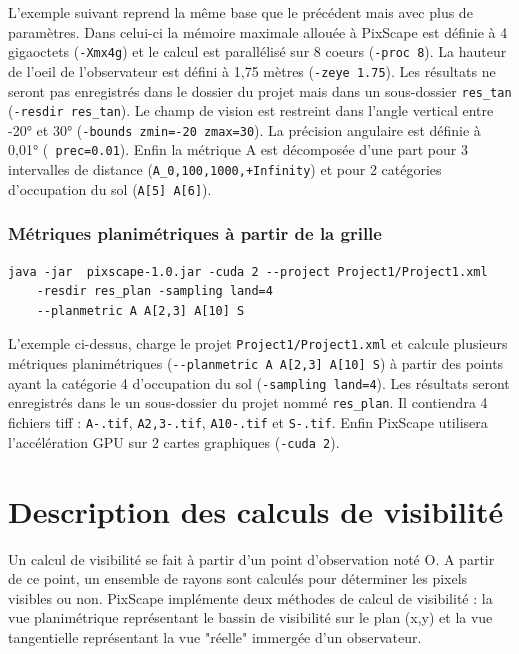 \documentclass{report}
\begin{document}
L'exemple suivant reprend la même base que le précédent mais avec plus de paramètres. Dans celui-ci la mémoire maximale allouée à PixScape est définie à 4 gigaoctets (\verb|-Xmx4g|) et le calcul est parallélisé sur 8 coeurs (\verb|-proc 8|). La hauteur de l'oeil de l'observateur est défini à 1,75 mètres (\verb|-zeye 1.75|). Les résultats ne seront pas enregistrés dans le dossier du projet mais dans un sous-dossier \verb|res_tan| (\verb|-resdir res_tan|). Le champ de vision est restreint dans l'angle vertical entre -20° et 30° (\verb|-bounds zmin=-20 zmax=30|). La précision angulaire est définie à 0,01° (\verb| prec=0.01|). Enfin la métrique A est décomposée d'une part pour 3 intervalles de distance (\verb|A_0,100,1000,+Infinity|) et pour 2 catégories d'occupation du sol (\verb|A[5] A[6]|).

\subsection{Métriques planimétriques à partir de la grille}
\begin{Verbatim}
java -jar  pixscape-1.0.jar -cuda 2 --project Project1/Project1.xml
	-resdir res_plan -sampling land=4 
	--planmetric A A[2,3] A[10] S
\end{Verbatim}
L'exemple ci-dessus, charge le projet \verb|Project1/Project1.xml| et calcule plusieurs métriques planimétriques (\verb|--planmetric A A[2,3] A[10] S|) à partir des points ayant la catégorie 4 d'occupation du sol (\verb|-sampling land=4|). Les résultats seront enregistrés dans le un sous-dossier du projet nommé \verb|res_plan|. Il contiendra 4 fichiers tiff : \verb|A-.tif|, \verb|A2,3-.tif|, \verb|A10-.tif| et \verb|S-.tif|. Enfin PixScape utilisera l'accélération GPU sur 2 cartes graphiques (\verb|-cuda 2|).


\chapter{Description des calculs de visibilité}
\label{principles}
Un calcul de visibilité se fait à partir d'un point d'observation noté O. A partir de ce point, un ensemble de rayons sont calculés pour déterminer les pixels visibles ou non. 
PixScape implémente deux méthodes de calcul de visibilité : la vue planimétrique représentant le bassin de visibilité sur le plan (x,y) et la vue tangentielle représentant la vue "réelle" immergée d'un observateur.
\end{document}
